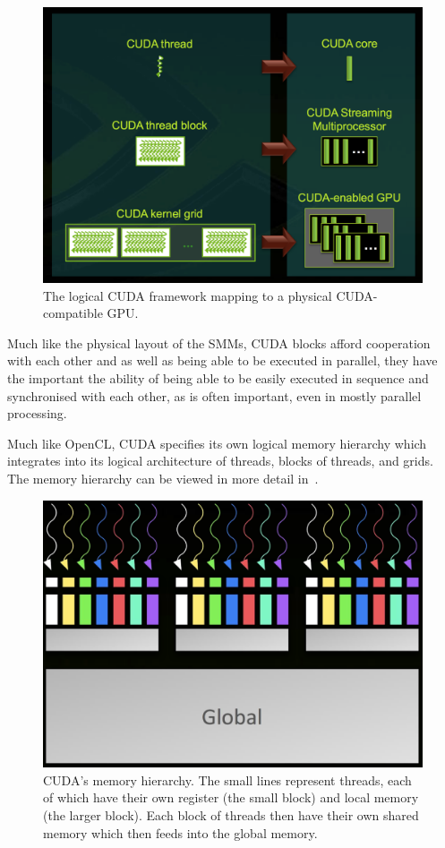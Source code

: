 \documentclass[a4paper,11pt]{article}
\begin{document}
\begin{figure}[ht]
  \centering
  \includegraphics[scale=0.2]{img/cuda-mapping}
  \caption{The logical CUDA framework mapping to a physical CUDA-compatible GPU.~\cite{slides:KhronosOpenCLOverview}}
\label{fig:cuda-mapping}
\end{figure}

Much like the physical layout of the SMMs, CUDA blocks afford cooperation with each other and as well as being able to be
executed in parallel, they have the important the ability of being able to be easily executed in sequence and synchronised
with each other, as is often important, even in mostly parallel processing.

Much like OpenCL, CUDA specifies its own logical memory hierarchy which integrates into its logical architecture of
threads, blocks of threads, and grids. The memory hierarchy can be viewed in more detail in~.

\begin{figure}[ht]
  \centering
  \includegraphics[scale=0.3]{img/cuda-mem}
  \caption{CUDA's memory hierarchy. The small lines represent threads, each of which have their own register (the small
  block) and local memory (the larger block). Each block of threads then have their own shared memory which then feeds
  into the global memory.~\cite{slides:KhronosOpenCLOverview}}
\label{fig:cuda-mem}
\end{figure}
\end{document}
